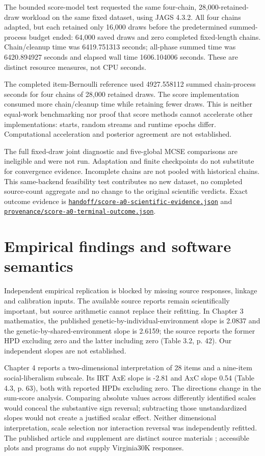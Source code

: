 \documentclass[11pt]{article}
\newcommand{\file}[1]{\href{https://github.com/alectionary/vibe-math/blob/master/formalization/schwabe-psychometric-genetics/#1}{\nolinkurl{#1}}}
\begin{document}
The bounded score-model test requested the same four-chain, 28,000-retained-draw workload on the same fixed dataset, using JAGS 4.3.2. All four chains adapted, but each retained only 16,000 draws before the predetermined summed-process budget ended: 64,000 saved draws and zero completed fixed-length chains. Chain/cleanup time was 6419.751313 seconds; all-phase summed time was 6420.894927 seconds and elapsed wall time 1606.104006 seconds. These are distinct resource measures, not CPU seconds.

The completed item-Bernoulli reference used 4927.558112 summed chain-process seconds for four chains of 28,000 retained draws. The score implementation consumed more chain/cleanup time while retaining fewer draws. This is neither equal-work benchmarking nor proof that score methods cannot accelerate other implementations: starts, random streams and runtime epochs differ. Computational acceleration and posterior agreement are not established.

The full fixed-draw joint diagnostic and five-global MCSE comparisons are ineligible and were not run. Adaptation and finite checkpoints do not substitute for convergence evidence. Incomplete chains are not pooled with historical chains. This same-backend feasibility test contributes no new dataset, no completed source-count aggregate and no change to the original scientific verdicts. Exact outcome evidence is \file{handoff/score-a0-scientific-evidence.json} and \file{provenance/score-a0-terminal-outcome.json}.

\section{Empirical findings and software semantics}\label{sec:empirical}
Independent empirical replication is blocked by missing source responses, linkage and calibration inputs. The available source reports remain scientifically important, but source arithmetic cannot replace their refitting. In Chapter 3 mathematics, the published genetic-by-individual-environment slope is 2.0837 and the genetic-by-shared-environment slope is 2.6159; the source reports the former HPD excluding zero and the latter including zero (Table 3.2, p. 42). Our independent slopes are not established.

Chapter 4 reports a two-dimensional interpretation of 28 items and a nine-item social-liberalism subscale. Its IRT AxE slope is -2.81 and AxC slope 0.54 (Table 4.3, p. 63), both with reported HPDs excluding zero. The directions change in the sum-score analysis. Comparing absolute values across differently identified scales would conceal the substantive sign reversal; subtracting those unstandardized slopes would not create a justified scalar effect. Neither dimensional interpretation, scale selection nor interaction reversal was independently refitted. The published article and supplement are distinct source materials \citep{schwabeConservatism}; accessible plots and programs do not supply Virginia30K responses.
\end{document}
